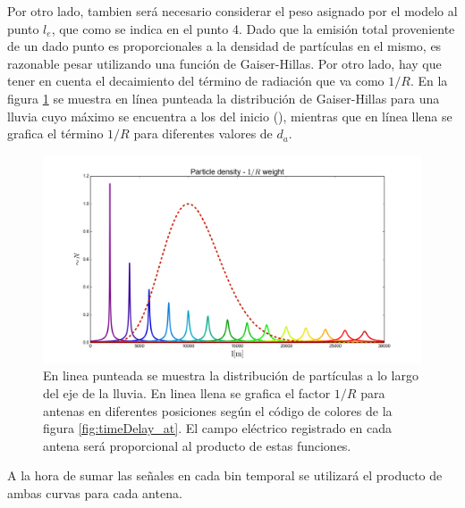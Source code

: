 	Por otro lado, tambien será necesario considerar el peso asignado por el modelo al punto $l_e$, que como se indica en el punto 4. 
	Dado que la emisi\'on total proveniente de un dado punto es proporcionales a la densidad de partículas en el mismo, es razonable pesar utilizando una función de Gaiser-Hillas.
	Por otro lado, hay que tener en cuenta el decaimiento del término de radiación que va como $1/R$.
	En la figura \ref{fig:timeDelay_pd} se muestra en línea punteada la distribución de Gaiser-Hillas para una lluvia cuyo máximo se encuentra a los  del inicio (), mientras que en línea llena se grafica el término $1/R$ para diferentes valores de $d_a$.
	\begin{figure}[ht!]
		\centering
		\includegraphics[width=\textwidth]{./fig/EASRadio/timeDelay_pd}
		\caption{\label{fig:timeDelay_pd}
		En linea punteada se muestra la distribuci\'on de part\'iculas a lo largo del eje de la lluvia. En linea llena se grafica el factor $1/R$ para antenas en diferentes posiciones seg\'un el c\'odigo de colores de la figura \ref{fig:timeDelay_at}.
		El campo el\'ectrico registrado en cada antena ser\'a proporcional al producto de estas funciones.
		}
	\end{figure}
	A la hora de sumar las señales en cada bin temporal se utilizará el producto de ambas curvas para cada antena.
	
